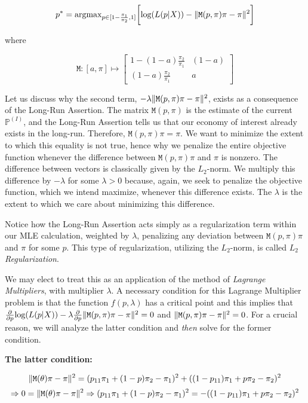 \documentclass{article}
\DeclarePairedDelimiter\norm{\lVert}{\rVert}
\begin{document}
\[
p^*
= \text{argmax}_{p \in [1-\frac{\pi_1}{\pi_2},1]} \bigg[ \text{log}(L(p|X)) - \norm{ \texttt{M}(p,\pi)\pi - \pi }^2 \bigg]
\]

where

\[
\texttt{M}: [a,\pi] \mapsto \begin{bmatrix}
    1-(1-a)\frac{\pi_2}{\pi_1} & (1-a) \\
    (1-a)\frac{\pi_2}{\pi_1} & a
\end{bmatrix}
\]

Let us discuss why the second term, $-\lambda \norm{ \texttt{M}(p,\pi)\pi - \pi }^2$, exists as a consequence of the Long-Run Assertion. The matrix $\texttt{M}(p,\pi)$ is the estimate of the current $\mathbb{P}^{(I)}$, and the Long-Run Assertion tells us that our economy of interest already exists in the long-run. Therefore, $\texttt{M}(p,\pi)\pi = \pi$. We want to minimize the extent to which this equality is not true, hence why we penalize the entire objective function whenever the difference between $\texttt{M}(p,\pi)\pi$ and $\pi$ is nonzero. The difference between vectors is classically given by the $L_2$-norm. We multiply this difference by $-\lambda$ for some $\lambda > 0$ because, again, we seek to penalize the objective function, which we intend maximize, whenever this difference exists. The $\lambda$ is the extent to which we care about minimizing this difference.

Notice how the Long-Run Assertion acts simply as a regularization term within our MLE calculation, weighted by $\lambda$, penalizing any deviation between $\texttt{M}(p,\pi)\pi$ and $\pi$ for some $p$. This type of regularization, utilizing the $L_2$-norm, is called \textit{$L_2$ Regularization}.

We may elect to treat this as an application of the method of \textit{Lagrange Multipliers}, with multiplier $\lambda$. A necessary condition for this Lagrange Multiplier problem is that the function $f(p, \lambda)$ has a critical point and this implies that $\frac{\partial}{\partial p} \text{log}(L(p|X)) - \lambda \frac{\partial}{\partial p} \norm{ \texttt{M}(p,\pi)\pi - \pi }^2 = 0$ and $\norm{ \texttt{M}(p,\pi)\pi - \pi }^2 = 0$. For a crucial reason, we will analyze the latter condition and \textit{then} solve for the former condition.


\textbf{The latter condition:}

\[
\norm{ \texttt{M}(\theta)\pi - \pi }^2
= (p_{11}\pi_1 + (1-p)\pi_2- \pi_1)^2
    + ((1-p_{11})\pi_1 + p\pi_2 - \pi_2)^2
\]\[
\Rightarrow 0
= \norm{ \texttt{M}(\theta)\pi - \pi }^2
\Rightarrow
(p_{11}\pi_1 + (1-p)\pi_2 - \pi_1)^2
=
-((1-p_{11})\pi_1 + p\pi_2 - \pi_2)^2
\]
\end{document}
